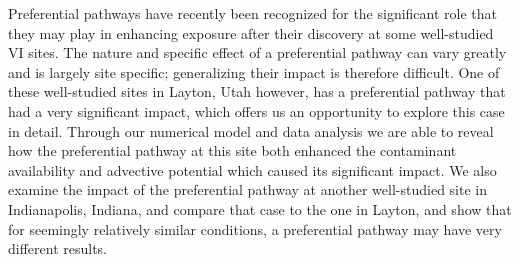 Preferential pathways have recently been recognized for the significant role that they may play in enhancing exposure after their discovery at some well-studied VI sites.
The nature and specific effect of a preferential pathway can vary greatly and is largely site specific; generalizing their impact is therefore difficult.
One of these well-studied sites in Layton, Utah however, has a preferential pathway that had a very significant impact, which offers us an opportunity to explore this case in detail.
Through our numerical model and data analysis we are able to reveal how the preferential pathway at this site both enhanced the contaminant availability and advective potential which caused its significant impact.
We also examine the impact of the preferential pathway at another well-studied site in Indianapolis, Indiana, and compare that case to the one in Layton, and show that for seemingly relatively similar conditions, a preferential pathway may have very different results.
